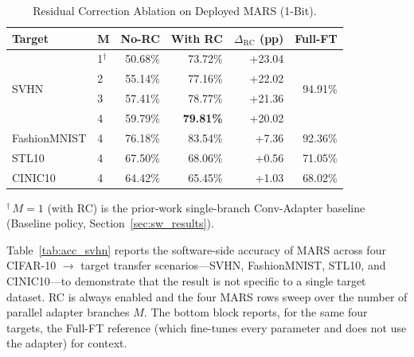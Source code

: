 \documentclass[12pt, a4paper]{report}
\numberwithin{equation}{chapter}
\numberwithin{figure}{chapter}
\numberwithin{table}{chapter}
\numberwithin{algorithm}{chapter}
\begin{document}
\begin{table}[H]
\centering
\caption{Residual Correction Ablation on Deployed MARS (1-Bit).}
\label{tab:rc_ablation_hw}
\begin{tabular}{llrrrr}
\toprule
\textbf{Target} & \textbf{M} & \textbf{No-RC} & \textbf{With RC} & \textbf{$\Delta_{\text{RC}}$ (pp)} & \textbf{Full-FT} \\
\midrule
\multirow{4}{*}{SVHN} & 1$^{\dagger}$ & 50.68\% & 73.72\% & +23.04 & \multirow{4}{*}{94.91\%} \\
 & 2 & 55.14\% & 77.16\% & +22.02 & \\
 & 3 & 57.41\% & 78.77\% & +21.36 & \\
 & 4 & 59.79\% & \textbf{79.81\%} & +20.02 & \\
\midrule
FashionMNIST & 4 & 76.18\% & 83.54\% & +7.36 & 92.36\% \\
STL10        & 4 & 67.50\% & 68.06\% & +0.56 & 71.05\% \\
CINIC10      & 4 & 64.42\% & 65.45\% & +1.03 & 68.02\% \\
\bottomrule
\end{tabular}
\begin{flushleft}
\footnotesize $^{\dagger}$\,$M{=}1$ (with RC) is the prior-work single-branch Conv-Adapter baseline~\cite{Chen2024ConvAdapter} (Baseline policy, Section~\ref{sec:sw_results}).
\end{flushleft}
\end{table}

Table~\ref{tab:acc_svhn} reports the software-side accuracy of MARS across four CIFAR-10 $\to$ target transfer scenarios---SVHN, FashionMNIST, STL10, and CINIC10---to demonstrate that the result is not specific to a single target dataset. RC is always enabled and the four MARS rows sweep over the number of parallel adapter branches $M$. The bottom block reports, for the same four targets, the Full-FT reference (which fine-tunes every parameter and does not use the adapter) for context.
\end{document}
